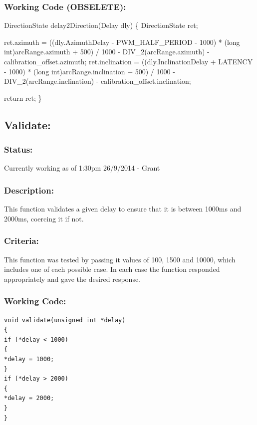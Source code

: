 \documentclass[]{report}
\begin{document}
\subsubsection{Working Code (OBSELETE):}
DirectionState delay2Direction(Delay dly) \newline
\{ \newline
	DirectionState ret; \newline
	
	ret.azimuth = ((dly.AzimuthDelay - PWM\_HALF\_PERIOD - 1000) * (long int)arcRange.azimuth + 500) / 1000 - DIV\_2(arcRange.azimuth) - calibration\_offset.azimuth; \newline
	ret.inclination = ((dly.InclinationDelay + LATENCY - 1000) * (long int)arcRange.inclination + 500) / 1000 - DIV\_2(arcRange.inclination) - calibration\_offset.inclination; \newline
	
	return ret; \newline
\} \newline

\subsection{Validate:}
\subsubsection{Status:}
Currently working as of 1:30pm 26/9/2014 - Grant

\subsubsection{Description:}
This function validates a given delay to ensure that it is between 1000ms and 2000ms, coercing it if not.

\subsubsection{Criteria:}
This function was tested by passing it values of 100, 1500 and 10000, which includes one of each possible case. In each case the function responded appropriately and gave the desired response.

\subsubsection{Working Code:}
\begin{lstlisting}
void validate(unsigned int *delay)
{
if (*delay < 1000)
{
*delay = 1000;
}
if (*delay > 2000)
{
*delay = 2000;
}
}
\end{lstlisting}
\end{document}
